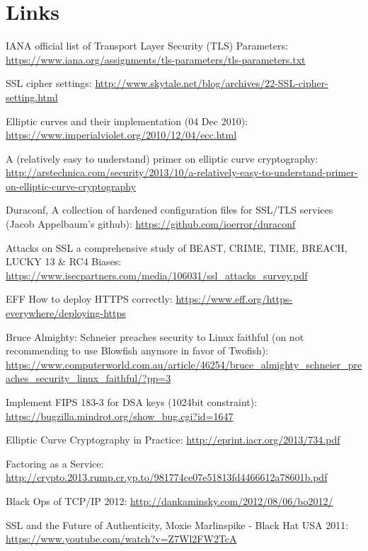 \chapter{Links}
\label{cha:links}

\begin{itemize*}
  \item IANA official list of Transport Layer Security (TLS) Parameters: \url{https://www.iana.org/assignments/tls-parameters/tls-parameters.txt}
  \item SSL cipher settings: \url{http://www.skytale.net/blog/archives/22-SSL-cipher-setting.html}
  \item Elliptic curves and their implementation (04 Dec 2010): \url{https://www.imperialviolet.org/2010/12/04/ecc.html}
  \item A (relatively easy to understand) primer on elliptic curve cryptography: \url{http://arstechnica.com/security/2013/10/a-relatively-easy-to-understand-primer-on-elliptic-curve-cryptography}
  \item Duraconf, A collection of hardened configuration files for SSL/TLS services (Jacob Appelbaum's github): \url{https://github.com/ioerror/duraconf}
  \item Attacks on SSL a comprehensive study of BEAST, CRIME, TIME, BREACH, LUCKY 13 \& RC4 Biases: \url{https://www.isecpartners.com/media/106031/ssl_attacks_survey.pdf}
  \item EFF How to deploy HTTPS correctly: \url{https://www.eff.org/https-everywhere/deploying-https}
  \item Bruce Almighty: Schneier preaches security to Linux faithful (on not recommending to use Blowfish anymore in favor of Twofish): \url{https://www.computerworld.com.au/article/46254/bruce_almighty_schneier_preaches_security_linux_faithful/?pp=3}
  \item Implement FIPS 183-3 for DSA keys (1024bit constraint): \url{https://bugzilla.mindrot.org/show_bug.cgi?id=1647}
  \item Elliptic Curve Cryptography in Practice: \url{http://eprint.iacr.org/2013/734.pdf}
  \item Factoring as a Service: \url{http://crypto.2013.rump.cr.yp.to/981774ce07e51813fd4466612a78601b.pdf}
  \item Black Ops of TCP/IP 2012: \url{http://dankaminsky.com/2012/08/06/bo2012/}
  \item SSL and the Future of Authenticity, Moxie Marlinspike - Black Hat USA 2011: \url{https://www.youtube.com/watch?v=Z7Wl2FW2TcA}

\end{itemize*}
